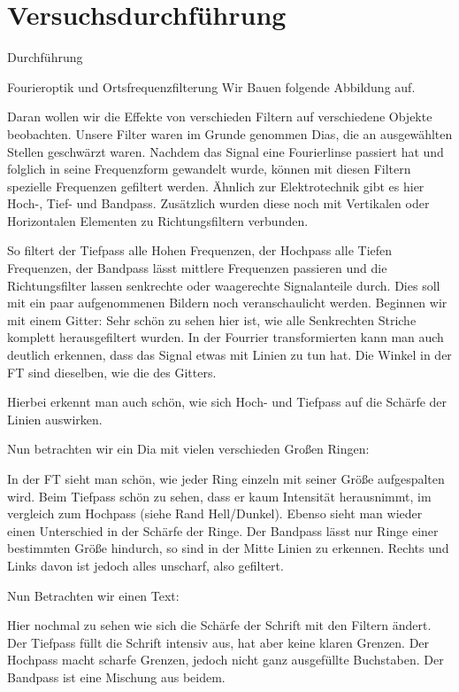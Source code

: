 \chapter{Versuchsdurchführung}
Durchführung

Fourieroptik und Ortsfrequenzfilterung
Wir Bauen folgende Abbildung auf.


Daran wollen wir die Effekte von verschieden Filtern auf verschiedene Objekte beobachten.
Unsere Filter waren im Grunde genommen Dias, die an ausgewählten Stellen geschwärzt waren.
Nachdem das Signal eine Fourierlinse passiert hat und folglich in seine Frequenzform gewandelt wurde, können mit diesen Filtern spezielle Frequenzen gefiltert werden.
Ähnlich zur Elektrotechnik gibt es hier Hoch-, Tief- und Bandpass. 
Zusätzlich wurden diese noch mit Vertikalen oder Horizontalen Elementen zu Richtungsfiltern verbunden.

So filtert der Tiefpass alle Hohen Frequenzen, der Hochpass alle Tiefen Frequenzen, der Bandpass lässt mittlere Frequenzen passieren und die Richtungsfilter lassen senkrechte oder waagerechte Signalanteile durch.
Dies soll mit ein paar aufgenommenen Bildern noch veranschaulicht werden.
Beginnen wir mit einem Gitter:
Sehr schön zu sehen hier ist, wie alle Senkrechten Striche komplett herausgefiltert wurden.
In der Fourrier transformierten kann man auch deutlich erkennen, dass das Signal etwas mit Linien zu tun hat. Die Winkel in der FT sind dieselben, wie die des Gitters.

Hierbei erkennt man auch schön, wie sich Hoch- und Tiefpass auf die Schärfe der Linien auswirken. 

Nun betrachten wir ein Dia mit vielen verschieden Großen Ringen:


In der FT sieht man schön, wie jeder Ring einzeln mit seiner Größe aufgespalten wird. Beim Tiefpass schön zu sehen, dass er kaum Intensität herausnimmt, im vergleich zum Hochpass (siehe Rand Hell/Dunkel). Ebenso sieht man wieder einen Unterschied in der Schärfe der Ringe. Der Bandpass lässt nur Ringe einer bestimmten Größe hindurch, so sind in der Mitte Linien zu erkennen. Rechts und Links davon ist jedoch alles unscharf, also gefiltert.

Nun Betrachten wir einen Text:


Hier nochmal zu sehen wie sich die Schärfe der Schrift mit den Filtern ändert. Der Tiefpass füllt die Schrift intensiv aus, hat aber keine klaren Grenzen. Der Hochpass macht scharfe Grenzen, jedoch nicht ganz ausgefüllte Buchstaben. Der Bandpass ist eine Mischung aus beidem.

